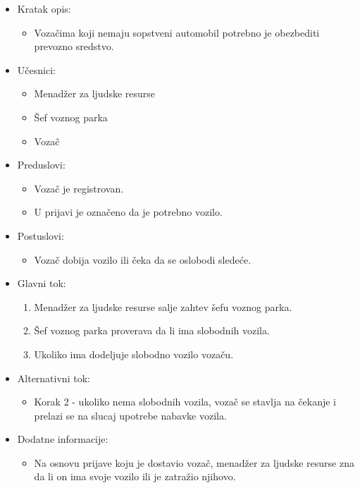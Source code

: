 \begin{itemize}
	\item Kratak opis:
		\begin{itemize}
			\item Vozačima koji nemaju sopstveni automobil potrebno je obezbediti prevozno sredstvo.		
		\end{itemize}
	\item Učesnici:
		\begin{itemize}
		    \item Menadžer za ljudske resurse
		    \item Šef voznog parka
		    \item Vozač
		\end{itemize}
	\item Preduslovi:
		\begin{itemize}
		    \item Vozač je registrovan.
		    \item U prijavi je označeno da je potrebno vozilo.
		\end{itemize}
	\item Postuslovi:
		\begin{itemize}
			\item Vozač dobija vozilo ili čeka da se oslobodi sledeće.
	    \end{itemize}
	\item Glavni tok:
		\begin{enumerate}
		    \item Menadžer za ljudske resurse salje zahtev šefu voznog parka.
		    \item Šef voznog parka proverava da li ima slobodnih vozila.
		    \item Ukoliko ima dodeljuje slobodno vozilo vozaču.
		\end{enumerate}
	\item Alternativni tok:
		\begin{itemize}
		    \item Korak 2 - ukoliko nema slobodnih vozila, vozač se stavlja na čekanje i prelazi se na slucaj upotrebe nabavke vozila.
		\end{itemize}
	\item Dodatne informacije:
		\begin{itemize}
			\item Na osnovu prijave koju je dostavio vozač, menadžer za ljudske resurse zna da li on ima svoje vozilo ili je zatražio njihovo.
		\end{itemize}
\end{itemize}


